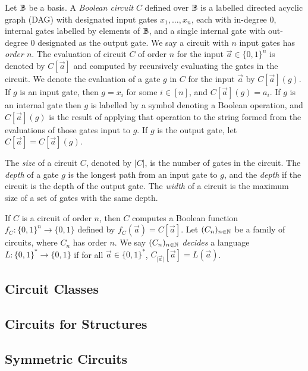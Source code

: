 \documentclass[../main/thesis.tex]{subfiles}
\begin{document}
Let $\mathbb{B}$ be a basis. A \emph{Boolean circuit} $C$ defined over $\mathbb{B}$ is a
labelled directed acyclic graph (DAG) with designated input gates $x_1, \ldots,
x_n$, each with in-degree $0$, internal gates labelled by elements of $\mathbb{B}$, and
a single internal gate with out-degree $0$ designated as the output gate. We say
a circuit with $n$ input gates has \emph{order $n$}. The evaluation of circuit
$C$ of order $n$ for the input $\vec{a} \in \{0,1\}^n$ is denoted by
$C[\vec{a}]$ and computed by recursively evaluating the gates in the circuit. We
denote the evaluation of a gate $g$ in $C$ for the input $\vec{a}$ by
$C[\vec{a}](g)$. If $g$ is an input gate, then $g = x_i$ for some $i \in [n]$,
and $C[\vec{a}](g) = a_i$. If $g$ is an internal gate then $g$ is labelled by a
symbol denoting a Boolean operation, and $C[\vec{a}](g)$ is the result of
applying that operation to the string formed from the evaluations of those gates
input to $g$. If $g$ is the output gate, let $C[\vec{a}] = C[\vec{a}](g)$.

The \emph{size} of a circuit $C$, denoted by $\vert C \vert$, is the number of
gates in the circuit. The \emph{depth} of a gate $g$ is the longest path from an
input gate to $g$, and the \emph{depth} if the circuit is the depth of the
output gate. The \emph{width} of a circuit is the maximum size of a set of gates
with the same depth.

If $C$ is a circuit of order $n$, then $C$ computes a Boolean function $f_C :
\{0,1\}^n \rightarrow \{0,1\}$ defined by $f_C(\vec{a}) = C[\vec{a}]$. Let
$(C_n)_{n \in \mathbb{N}}$ be a family of circuits, where $C_n$ has order $n$. We say
$(C_n)_{n \in \mathbb{N}}$ \emph{decides} a language $L : \{0,1\}^{*} \rightarrow
\{0,1\}$ if for all $\vec{a} \in \{0,1\}^{*}$, $C_{\vert \vec{a} \vert}
[\vec{a}] = L(\vec{a})$.


\subsection{Circuit Classes}

\subsection{Circuits for Structures}

\subsection{Symmetric Circuits}


 
\end{document}
